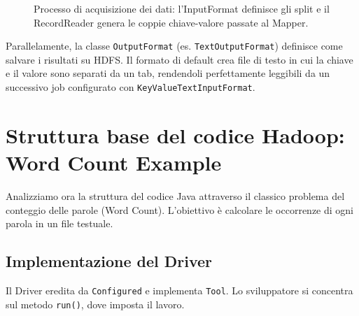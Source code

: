 \begin{figure}[H]
    \centering
    \caption{Processo di acquisizione dei dati: l'InputFormat definisce gli split e il RecordReader genera le coppie chiave-valore passate al Mapper.}
    \label{fig:input-format}
\end{figure}

Parallelamente, la classe \texttt{OutputFormat} (es. \texttt{TextOutputFormat}) definisce come salvare i risultati su HDFS. Il formato di default crea file di testo in cui la chiave e il valore sono separati da un tab, rendendoli perfettamente leggibili da un successivo job configurato con \texttt{KeyValueTextInputFormat}.

\section{Struttura base del codice Hadoop: Word Count Example}

Analizziamo ora la struttura del codice Java attraverso il classico problema del conteggio delle parole (Word Count). L'obiettivo è calcolare le occorrenze di ogni parola in un file testuale.

\subsection{Implementazione del Driver}

Il Driver eredita da \texttt{Configured} e implementa \texttt{Tool}. Lo sviluppatore si concentra sul metodo \texttt{run()}, dove imposta il lavoro.

